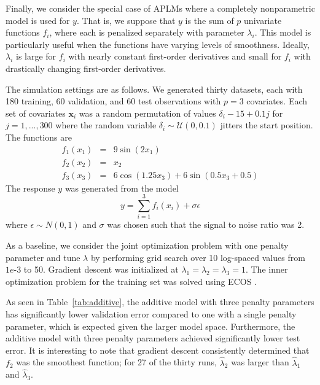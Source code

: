 \documentclass{statsoc}
\begin{document}
Finally, we consider the special case of APLMs where a completely nonparametric model is used for $y$. That is, we suppose that $y$ is the sum of $p$ univariate functions $f_i$, where each is penalized separately with parameter $\lambda_i$. This model is particularly useful when the functions have varying levels of smoothness. Ideally, $\lambda_i$ is large for $f_i$ with nearly constant first-order derivatives and small for $f_i$ with drastically changing first-order derivatives. 

The simulation settings are as follows. We generated thirty datasets, each with 180 training, 60 validation, and 60 test observations with $p=3$ covariates. Each set of covariates $\boldsymbol{x}_i$ was a random permutation of values $\delta_i - 15 + 0.1 j$ for $j=1,...,300$ where the random variable $\delta_i \sim \mathcal{U}(0, 0.1)$ jitters the start position. The functions are 
\begin{equation}
\begin{array}{ccl}
f_1(x_1) &=& 9 \sin(2x_1)\\
f_2(x_2) &=& x_2 \\
f_3(x_3) &=& 6 \cos(1.25 x_3) + 6 \sin(0.5 x_3 + 0.5)
\end{array}
\end{equation}
The response $y$ was generated from the model 
\begin{equation}
y=\sum _{i=1}^3 f_i(x_i) + \sigma \epsilon
\end{equation}
where $\epsilon \sim N(0, 1)$ and $\sigma$ was chosen such that the signal to noise ratio was 2.

As a baseline, we consider the joint optimization problem with one penalty parameter and tune $\lambda$ by performing grid search over 10 log-spaced values from $1e$-3 to 50. Gradient descent was initialized at $\lambda_1=\lambda_2=\lambda_3=1$. The inner optimization problem for the training set was solved using ECOS \citep{Domahidi2013ecos}.

As seen in Table~\ref{tab:additive}, the additive model with three penalty parameters has significantly lower validation error compared to one with a single penalty parameter, which is expected given the larger model space. Furthermore, the additive model with three penalty parameters achieved significantly lower test error. It is interesting to note that gradient descent consistently determined that $f_2$ was the smoothest function; for 27 of the thirty runs, $\hat{\lambda}_2$ was larger than $\hat{\lambda}_1$ and $\hat{\lambda}_3$.
\end{document}
